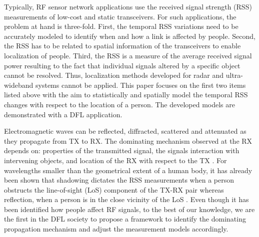 \documentclass[journal, 10pt, twocolumn, balance]{IEEEtran}
\begin{document}
Typically, RF sensor network applications use the received signal strength (RSS) measurements of low-cost and static transceivers. For such applications, the problem at hand is three-fold. First, the temporal RSS variations need to be accurately modeled to identify when and how a link is affected by people. Second, the RSS has to be related to spatial information of the transceivers to enable localization of people. Third, the RSS is a measure of the average received signal power resulting to the fact that individual signals altered by a specific object cannot be resolved. Thus, localization methods developed for radar and ultra-wideband systems cannot be applied. This paper focuses on the first two items listed above with the aim to statistically and spatially model the temporal RSS changes with respect to the location of a person. The developed models are demonstrated with a DFL application.

Electromagnetic waves can be reflected, diffracted, scattered and attenuated as they propagate from TX to RX. The dominating mechanism observed at the RX depends on: properties of the transmitted signal, the signals interaction with intervening objects, and location of the RX with respect to the TX \cite[Ch. 4]{Molisch2010}. For wavelengths smaller than the geometrical extent of a human body, it has already been shown that shadowing dictates the RSS measurements when a person obstructs the line-of-sight (LoS) component of the TX-RX pair \cite{patwari08} whereas reflection, when a person is in the close vicinity of the LoS \cite{patwari2011b}. Even though it has been identified how people affect RF signals, to the best of our knowledge, we are the first in the DFL society to propose a framework to identify the dominating propagation mechanism and adjust the measurement models accordingly.
\end{document}
